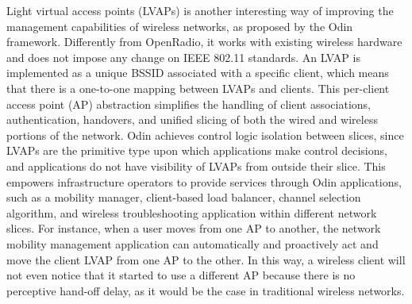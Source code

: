 Light virtual access points (LVAPs) is another interesting way of improving the management capabilities of 
wireless networks, as proposed by the Odin~\cite{schulz-zander2014-atc} framework. Differently from OpenRadio, 
it works with existing wireless hardware and does not impose any change on IEEE 802.11 standards. 
An LVAP is implemented as a unique BSSID associated with a specific client, which means that there is a one-to-one mapping 
between LVAPs and clients. This per-client access point (AP) abstraction simplifies the handling of client associations, authentication, handovers, and unified slicing of both the wired and wireless portions of the network. Odin achieves control logic isolation between slices, since LVAPs are the primitive type upon which applications make control decisions, and applications do not have visibility of LVAPs from outside their slice.
This empowers infrastructure operators to provide services through Odin applications, such as a mobility manager, client-based load balancer, channel selection algorithm, and wireless troubleshooting application within different network slices. For instance, when a user moves from one AP to another, the 
network mobility management application can automatically and proactively act and move the client LVAP from one 
AP to the other. In this way, a wireless client will not even notice that it started to use a different AP 
because there is no perceptive hand-off delay, as it would be the case in traditional wireless networks.



